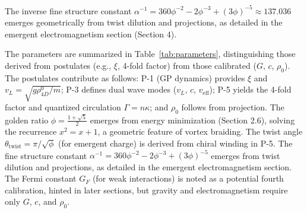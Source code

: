 The inverse fine structure constant $\alpha^{-1} = 360 \phi^{-2} - 2 \phi^{-3} + (3 \phi)^{-5} \approx 137.036$ emerges geometrically from twist dilution and projections, as detailed in the emergent electromagnetism section (Section 4).

The parameters are summarized in Table~\ref{tab:parameters}, distinguishing those derived from postulates (e.g., $\xi$, 4-fold factor) from those calibrated ($G$, $c$, $\rho_0$). The postulates contribute as follows: P-1 (GP dynamics) provides $\xi$ and $v_L = \sqrt{g \rho_{4D}^0 / m}$; P-3 defines dual wave modes ($v_L$, $c$, $v_{\text{eff}}$); P-5 yields the 4-fold factor and quantized circulation $\Gamma = n \kappa$; and $\rho_0$ follows from projection. The golden ratio $\phi = \frac{1 + \sqrt{5}}{2}$ emerges from energy minimization (Section 2.6), solving the recurrence $x^2 = x + 1$, a geometric feature of vortex braiding. The twist angle $\theta_{\text{twist}} = \pi / \sqrt{\phi}$ (for emergent charge) is derived from chiral winding in P-5. The fine structure constant $\alpha^{-1} = 360 \phi^{-2} - 2 \phi^{-3} + (3 \phi)^{-5}$ emerges from twist dilution and projections, as detailed in the emergent electromagnetism section. The Fermi constant $G_F$ (for weak interactions) is noted as a potential fourth calibration, hinted in later sections, but gravity and electromagnetism require only $G$, $c$, and $\rho_0$.

